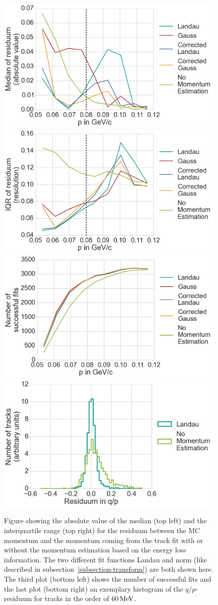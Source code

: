 \begin{figure}
  \centering
  \includegraphics[width=0.48\linewidth]{figures/vxd/kalman0_3Median.png}
  \includegraphics[width=0.48\linewidth]{figures/vxd/kalman0_3IQR.png}
  \includegraphics[width=0.48\linewidth]{figures/vxd/kalman0_3Count.png}
  \includegraphics[width=0.48\linewidth]{figures/vxd/residuum_histogram.png}
  \caption[Residuum of the momentum estimation for different fit functions.]{Figure showing the absolute value of the median (top left) and the interquartile range (top right) for the residuum between the MC momentum and the momentum coming from the track fit with or without the momentum estimation based on the energy loss information. The two different fit functions Landau and norm (like described in subsection~\ref{subsection-transform}) are both shown here. The third plot (bottom left) shows the number of successful fits and the last plot (bottom right) an exemplary histogram of the $q/p$-residuum for tracks in the order of $\unit[60]{MeV}$.}
  \label{fig-results-fit}
\end{figure}



